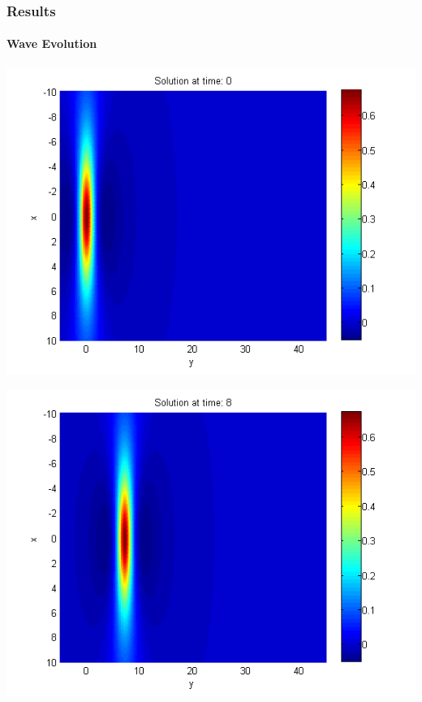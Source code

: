 \documentclass{beamer}
\begin{document}
\begin{frame}
\frametitle{Results}
\framesubtitle{Wave Evolution}
\begin{center}\vspace{0.4cm}
	\begin{minipage}[b]{0.30\linewidth}
		\includegraphics[width=\linewidth]{figures/Solution1_t=0.png}
	\end{minipage}	
	\begin{minipage}[b]{0.30\linewidth}
		\includegraphics[width=\linewidth]{figures/Solution1_t=8.png}
	\end{minipage}	
	\begin{minipage}[b]{0.30\linewidth}

\end{minipage}
\end{center}
\end{frame}
\end{document}
